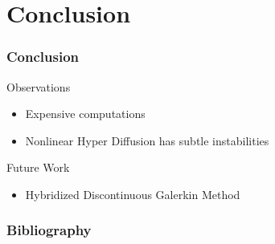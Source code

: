 \documentclass[10pt]{beamer}
\begin{document}
  \section{Conclusion}
    \begin{frame}
      \frametitle{Conclusion}
      Observations
      \begin{itemize}
        \item Expensive computations
        \item Nonlinear Hyper Diffusion has subtle instabilities
      \end{itemize}
      Future Work
      \begin{itemize}
        \item Hybridized Discontinuous Galerkin Method
      \end{itemize}
    \end{frame}

    \begin{frame}[allowframebreaks]
      \frametitle{Bibliography}
      \nocite{*}
      \printbibliography{}
    \end{frame}
\end{document}
